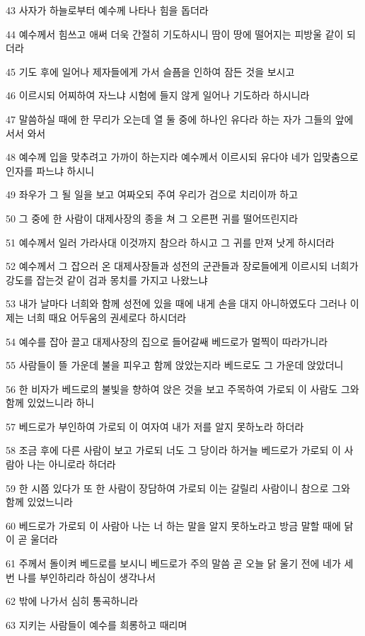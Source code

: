 \par 43 사자가 하늘로부터 예수께 나타나 힘을 돕더라
\par 44 예수께서 힘쓰고 애써 더욱 간절히 기도하시니 땀이 땅에 떨어지는 피방울 같이 되더라
\par 45 기도 후에 일어나 제자들에게 가서 슬픔을 인하여 잠든 것을 보시고
\par 46 이르시되 어찌하여 자느냐 시험에 들지 않게 일어나 기도하라 하시니라
\par 47 말씀하실 때에 한 무리가 오는데 열 둘 중에 하나인 유다라 하는 자가 그들의 앞에 서서 와서
\par 48 예수께 입을 맞추려고 가까이 하는지라 예수께서 이르시되 유다야 네가 입맞춤으로 인자를 파느냐 하시니
\par 49 좌우가 그 될 일을 보고 여짜오되 주여 우리가 검으로 치리이까 하고
\par 50 그 중에 한 사람이 대제사장의 종을 쳐 그 오른편 귀를 떨어뜨린지라
\par 51 예수께서 일러 가라사대 이것까지 참으라 하시고 그 귀를 만져 낫게 하시더라
\par 52 예수께서 그 잡으러 온 대제사장들과 성전의 군관들과 장로들에게 이르시되 너희가 강도를 잡는것 같이 검과 몽치를 가지고 나왔느냐
\par 53 내가 날마다 너희와 함께 성전에 있을 때에 내게 손을 대지 아니하였도다 그러나 이제는 너희 때요 어두움의 권세로다 하시더라
\par 54 예수를 잡아 끌고 대제사장의 집으로 들어갈쌔 베드로가 멀찍이 따라가니라
\par 55 사람들이 뜰 가운데 불을 피우고 함께 앉았는지라 베드로도 그 가운데 앉았더니
\par 56 한 비자가 베드로의 불빛을 향하여 앉은 것을 보고 주목하여 가로되 이 사람도 그와 함께 있었느니라 하니
\par 57 베드로가 부인하여 가로되 이 여자여 내가 저를 알지 못하노라 하더라
\par 58 조금 후에 다른 사람이 보고 가로되 너도 그 당이라 하거늘 베드로가 가로되 이 사람아 나는 아니로라 하더라
\par 59 한 시쯤 있다가 또 한 사람이 장담하여 가로되 이는 갈릴리 사람이니 참으로 그와 함께 있었느니라
\par 60 베드로가 가로되 이 사람아 나는 너 하는 말을 알지 못하노라고 방금 말할 때에 닭이 곧 울더라
\par 61 주께서 돌이켜 베드로를 보시니 베드로가 주의 말씀 곧 오늘 닭 울기 전에 네가 세 번 나를 부인하리라 하심이 생각나서
\par 62 밖에 나가서 심히 통곡하니라
\par 63 지키는 사람들이 예수를 희롱하고 때리며
